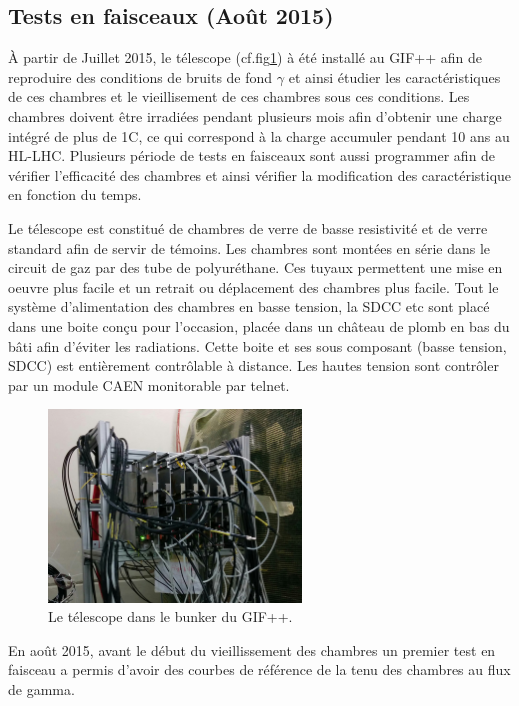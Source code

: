 \subsection{Tests en faisceaux (Août 2015)}
À partir de Juillet 2015, le télescope (cf.fig\ref{GIFppChambers}) à été installé au GIF++ afin de reproduire des conditions de bruits de fond $\gamma$ et ainsi étudier les caractéristiques de ces chambres et le vieillisement de ces chambres sous ces conditions. Les chambres doivent être irradiées pendant plusieurs mois afin d'obtenir une charge intégré de plus de 1C, ce qui correspond à la charge accumuler pendant 10 ans au HL-LHC.
Plusieurs période de tests en faisceaux sont aussi programmer afin de vérifier l'efficacité des chambres et ainsi vérifier la modification des caractéristique en fonction du temps.

Le télescope est constitué de chambres de verre de basse resistivité et de verre standard afin de servir de témoins. Les chambres sont montées en série dans le circuit de gaz par des tube de polyuréthane. Ces tuyaux permettent une mise en oeuvre plus facile et un retrait ou déplacement des chambres plus facile. Tout le système d'alimentation des chambres en basse tension, la SDCC etc sont placé dans une boite conçu pour l'occasion, placée dans un château de plomb en bas du bâti afin d'éviter les radiations. Cette boite et ses sous composant (basse tension, SDCC) est entièrement contrôlable à distance. Les hautes tension sont contrôler par un module CAEN monitorable par telnet.

\begin{figure}[!ht]
	\centering
	\includegraphics[width=0.6\textwidth]{GLA/GIFppChambers.png}
	\caption{Le télescope dans le bunker du GIF++.}
	\label{GIFppChambers}
\end{figure}

En août 2015, avant le début du vieillissement des chambres un premier test en faisceau a permis d'avoir des courbes de référence de la tenu des chambres au flux de gamma.


